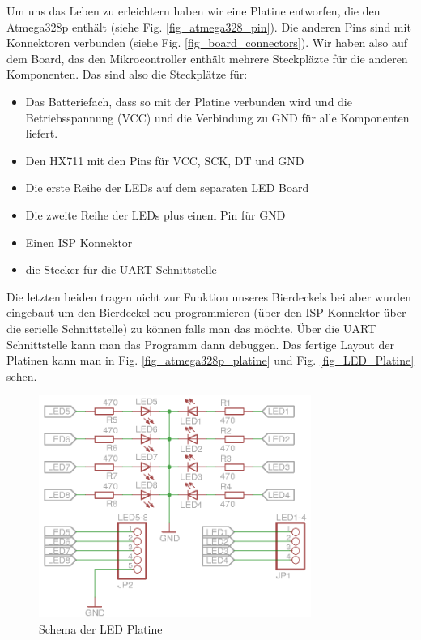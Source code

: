 \documentclass[12pt,journal]{IEEEtran}
\begin{document}
Um uns das Leben zu erleichtern haben wir eine Platine entworfen, die den Atmega328p enthält
(siehe Fig. \ref{fig_atmega328_pin}). Die anderen Pins sind mit Konnektoren verbunden (siehe Fig. \ref{fig_board_connectors}).
Wir haben also auf dem Board, das den Mikrocontroller enthält mehrere Steckpläzte für die anderen
Komponenten. Das sind also die Steckplätze für:
\begin{itemize}
 \item Das Batteriefach, dass so mit der Platine verbunden wird und die Betriebsspannung (VCC) und die Verbindung zu GND für alle Komponenten liefert.
 \item Den HX711 mit den Pins für VCC, SCK, DT und GND
 \item Die erste Reihe der LEDs auf dem separaten LED Board
 \item Die zweite Reihe der LEDs plus einem Pin für GND
 \item Einen ISP Konnektor
 \item die Stecker für die UART Schnittstelle
\end{itemize}

Die letzten beiden tragen nicht zur Funktion unseres Bierdeckels bei aber wurden eingebaut um den
Bierdeckel neu programmieren (über den ISP Konnektor über die serielle Schnittstelle) zu können
falls man das möchte. Über die UART Schnittstelle kann man das Programm dann debuggen.
Das fertige Layout der Platinen kann man in Fig. \ref{fig_atmega328p_platine} und Fig. \ref {fig_LED_Platine} sehen.


\begin{figure}[htbp]
  \centering
    \includegraphics[width=3.5in]{images/LED_Platine_Schema_complete.png}
    \caption{Schema der LED Platine}
  \label{fig_led_platine}
\end{figure}
\end{document}
